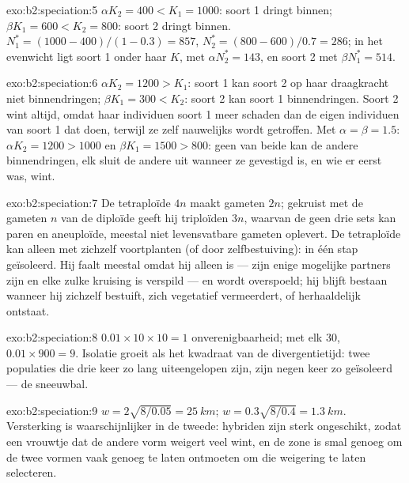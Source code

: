 \begin{solution}{exo:b2:speciation:5}
$\alpha K_2 = 400 < K_1 = 1000$: soort 1 dringt binnen; $\beta K_1 = 600
< K_2 = 800$: soort 2 dringt binnen. $N_1^{*} = (1000 - 400)/(1 - 0.3) =
857$, $N_2^{*} = (800 - 600)/0.7 = 286$; in het evenwicht ligt soort
1 onder haar $K$, met $\alpha N_2^{*} = 143$, en soort 2 met $\beta
N_1^{*} = 514$.
\end{solution}

\begin{solution}{exo:b2:speciation:6}
$\alpha K_2 = 1200 > K_1$: soort 1 kan soort 2 op haar draagkracht
niet binnendringen; $\beta K_1 = 300 < K_2$: soort 2 kan soort 1
binnendringen. Soort 2 wint altijd, omdat haar individuen soort 1 meer
schaden dan de eigen individuen van soort 1 dat doen, terwijl ze zelf
nauwelijks wordt getroffen. Met $\alpha = \beta = 1.5$: $\alpha K_2 = 1200 > 1000$
en $\beta K_1 = 1500 > 800$: geen van beide kan de andere binnendringen, elk
sluit de andere uit wanneer ze gevestigd is, en wie er eerst was, wint.
\end{solution}

\begin{solution}{exo:b2:speciation:7}
De tetraploïde $4n$ maakt gameten $2n$; gekruist met de gameten $n$ van de
diploïde geeft hij triploïden $3n$, waarvan de  geen drie
sets kan paren en aneuploïde, meestal niet levensvatbare gameten oplevert. De
tetraploïde kan alleen met zichzelf voortplanten (of door zelfbestuiving):
in één stap geïsoleerd. Hij faalt meestal omdat hij alleen is --- zijn enige
mogelijke partners zijn  en elke zulke kruising is verspild ---
en wordt overspoeld; hij blijft bestaan wanneer hij zichzelf bestuift, zich
vegetatief vermeerdert, of herhaaldelijk ontstaat.
\end{solution}

\begin{solution}{exo:b2:speciation:8}
$0.01\times 10\times 10 = 1$ onverenigbaarheid; met elk 30, $0.01\times
900 = 9$. Isolatie groeit als het kwadraat van de divergentietijd: twee
populaties die drie keer zo lang uiteengelopen zijn, zijn negen keer zo
geïsoleerd --- de sneeuwbal.
\end{solution}

\begin{solution}{exo:b2:speciation:9}
$w = 2\sqrt{8/0.05} = \qty{25}{km}$; $w = 0.3\sqrt{8/0.4} =
\qty{1.3}{km}$. Versterking is waarschijnlijker in de tweede: hybriden
zijn sterk ongeschikt, zodat een vrouwtje dat de andere vorm weigert
veel wint, en de zone is smal genoeg om de twee vormen vaak genoeg te laten
ontmoeten om die weigering te laten selecteren.
\end{solution}


